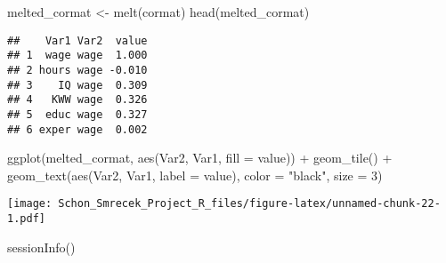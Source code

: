 \documentclass[
]{article}
\newenvironment{Shaded}{\begin{snugshade}}{\end{snugshade}}
\newcommand{\AttributeTok}[1]{\textcolor[rgb]{0.77,0.63,0.00}{#1}}
\newcommand{\DecValTok}[1]{\textcolor[rgb]{0.00,0.00,0.81}{#1}}
\newcommand{\FunctionTok}[1]{\textcolor[rgb]{0.00,0.00,0.00}{#1}}
\newcommand{\NormalTok}[1]{#1}
\newcommand{\OtherTok}[1]{\textcolor[rgb]{0.56,0.35,0.01}{#1}}
\newcommand{\SpecialCharTok}[1]{\textcolor[rgb]{0.00,0.00,0.00}{#1}}
\newcommand{\StringTok}[1]{\textcolor[rgb]{0.31,0.60,0.02}{#1}}
\begin{document}
\begin{Shaded}
\begin{Highlighting}[]
\NormalTok{melted\_cormat }\OtherTok{\textless{}{-}} \FunctionTok{melt}\NormalTok{(cormat)}
\FunctionTok{head}\NormalTok{(melted\_cormat)}
\end{Highlighting}
\end{Shaded}

\begin{verbatim}
##    Var1 Var2  value
## 1  wage wage  1.000
## 2 hours wage -0.010
## 3    IQ wage  0.309
## 4   KWW wage  0.326
## 5  educ wage  0.327
## 6 exper wage  0.002
\end{verbatim}

\begin{Shaded}
\begin{Highlighting}[]
\FunctionTok{ggplot}\NormalTok{(melted\_cormat, }\FunctionTok{aes}\NormalTok{(Var2, Var1, }\AttributeTok{fill =}\NormalTok{ value)) }\SpecialCharTok{+} 
  \FunctionTok{geom\_tile}\NormalTok{() }\SpecialCharTok{+} 
  \FunctionTok{geom\_text}\NormalTok{(}\FunctionTok{aes}\NormalTok{(Var2, Var1, }\AttributeTok{label =}\NormalTok{ value), }\AttributeTok{color =} \StringTok{"black"}\NormalTok{, }\AttributeTok{size =} \DecValTok{3}\NormalTok{) }
\end{Highlighting}
\end{Shaded}

\texttt{[image: Schon\_Smrecek\_Project\_R\_files/figure-latex/unnamed-chunk-22-1.pdf]}

\begin{Shaded}
\begin{Highlighting}[]
\FunctionTok{sessionInfo}\NormalTok{()}
\end{Highlighting}
\end{Shaded}
\end{document}
